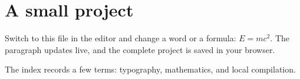 \section{A small project}

Switch to this file in the editor and change a word or a formula: $E=mc^2$.
The paragraph updates live, and the complete project is saved in your browser.

The index records a few terms: typography,
mathematics, and local compilation.
